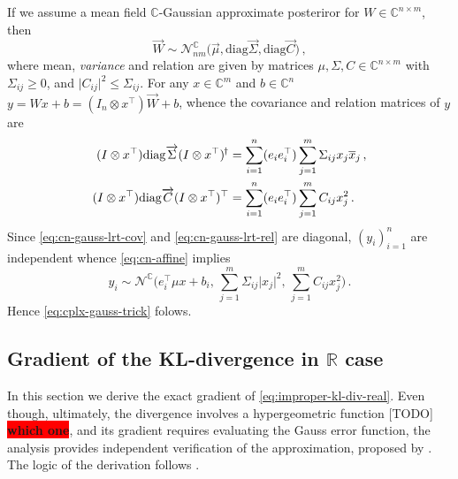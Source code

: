 \documentclass[a4paper,10pt]{article}
\newcommand{\real}{\mathbb{R}}
\newcommand{\cplx}{\mathbb{C}}
\newcommand{\hop}{{\mkern-1.5mu\dagger}}
\newcommand{\conj}[1]{\overline{#1}}
\renewcommand{\vec}[1]{\overrightarrow{#1}}
\newcommand{\diag}[1]{\mathrm{diag}{#1}}
\newcommand{\important}[1]{\textbf{\!\colorbox{red}{#1}\!}}
\newcommand{\todo}[1]{{\color{blue} [TODO]} \important{#1}}
\begin{document}
If we assume a mean field $\cplx$-Gaussian approximate posteriror for $
  W \in \cplx^{n\times m}
$, then
\begin{equation}  \label{eq:c-gauss-vi-general-vec}
  \vec{W}
    \sim \mathcal{N}^{\cplx}_{nm} \bigl(
      \vec{\mu}, \diag{\vec{\Sigma}}, \diag{\vec{C}}
    \bigr)
  \,,
\end{equation}
where mean, \textit{variance} and relation are given by matrices $
  \mu, \Sigma, C \in \cplx^{n\times m}
$ with $\Sigma_{ij} \geq 0$, and $
  \lvert C_{ij} \rvert^2 \leq \Sigma_{ij}
$. For any $x \in \cplx^m$ and $b\in \cplx^n$ $
  y = W x + b
    = (I_n \otimes x^\top) \vec{W} + b
$, whence the covariance and relation matrices of $y$ are
\begin{align}
  (I \otimes x^\top) \diag{\vec{\Sigma}} (I \otimes x^\top)^{\hop}
    & = \sum_{i=1}^n (e_i e_i^\top) \sum_{j=1}^m \Sigma_{ij} x_j \conj{x}_j
    \,,  \label{eq:cn-gauss-lrt-cov} \\
  (I \otimes x^\top) \diag{\vec{C}} (I \otimes x^\top)^\top
    & = \sum_{i=1}^n (e_i e_i^\top) \sum_{j=1}^m C_{ij} x_j^2
    \,.  \label{eq:cn-gauss-lrt-rel}
\end{align}
Since \eqref{eq:cn-gauss-lrt-cov} and \eqref{eq:cn-gauss-lrt-rel} are diagonal, $(y_i)_{i=1}^n$
are independent whence \eqref{eq:cn-affine} implies
\begin{equation}  \label{eq:cplx-gauss-trick-appendix}
  y_i
    \sim \mathcal{N}^{\cplx}
      \bigl(
        e_i^\top \mu x + b_i,
        \, \sum_{j=1}^m \Sigma_{ij} \lvert x_j \rvert^2,
        \, \sum_{j=1}^m C_{ij} x_j^2
      \bigr)
    \,.
\end{equation}
Hence \eqref{eq:cplx-gauss-trick} folows.


\subsection{Gradient of the KL-divergence in $\real$ case} %
\label{sub:real-chisq-grad}  %

In this section we derive the exact gradient of \eqref{eq:improper-kl-div-real}. Even
though, ultimately, the divergence involves a hypergeometric function \todo{which one},
and its gradient requires evaluating the Gauss error function, the analysis provides
independent verification of the approximation, proposed by \citet{molchanov_variational_2017}.
The logic of the derivation follows \citet{lapidoth_capacity_2003}.
\end{document}

